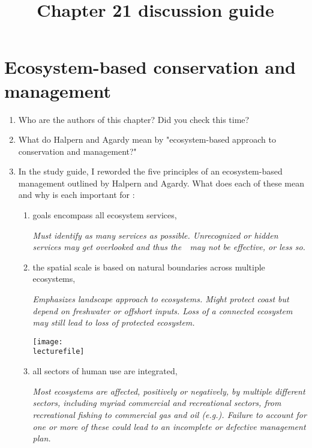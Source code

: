 \documentclass[letterpaper]{tufte-handout}
\title{Chapter 21 discussion guide}
\date{} %
\newcommand\lecturefile{434_lecture03_instructor}
\begin{document}
\maketitle	%

\section*{Ecosystem-based conservation and management}

\begin{enumerate}

	\item Who are the authors of this chapter? Did you check this time?%
	
	\item What do Halpern and Agardy mean by "ecosystem-based approach to conservation and management?"
	
	\item In the study guide, I reworded the five principles of an ecosystem-based management  outlined by Halpern and Agardy. What does each of these mean and why is each important for :
	
	\begin{enumerate}
		\item goals encompass all ecosystem services,\label{item:all_services}
		
		\textit{Must identify as many services as possible. Unrecognized or hidden services may get overlooked and thus the~~may not be effective, or less so.}
		
		\item the spatial scale is based on natural boundaries across multiple ecosystems, \label{item:spatial_scale}
		
		\textit{Emphasizes landscape approach to ecosystems. Might protect coast but depend on freshwater or offshort inputs. Loss of a connected ecosystem may still lead to loss of protected ecosystem.}

	\begin{marginfigure}
		\texttt{[image: \\lecturefile]}
	\end{marginfigure}
		
		\item all sectors of human use are integrated,\label{item:all_sectors}
		
		\textit{Most ecosystems are affected, positively or negatively, by multiple different sectors, including myriad commercial and recreational sectors, from recreational fishing to commercial gas and oil (e.g.). Failure to account for one or more of these could lead to an incomplete or defective management plan.}
		

\end{enumerate}
\end{enumerate}
\end{document}
